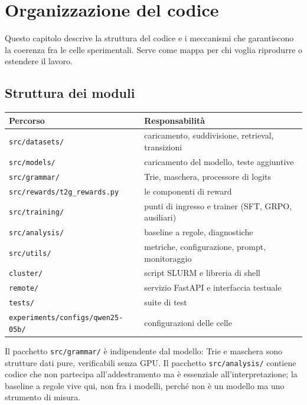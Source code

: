 \chapter{Organizzazione del codice}
\label{cap:codebase}

Questo capitolo descrive la struttura del codice e i meccanismi che garantiscono
la coerenza fra le celle sperimentali. Serve come mappa per chi voglia
riprodurre o estendere il lavoro.

\section{Struttura dei moduli}

\begin{center}
\begin{tabular}{ll}
\toprule
Percorso & Responsabilità \\
\midrule
\texttt{src/datasets/} & caricamento, suddivisione, retrieval, transizioni \\
\texttt{src/models/} & caricamento del modello, teste aggiuntive \\
\texttt{src/grammar/} & Trie, maschera, processore di logits \\
\texttt{src/rewards/t2g\_rewards.py} & le componenti di reward \\
\texttt{src/training/} & punti di ingresso e trainer (SFT, GRPO, ausiliari) \\
\texttt{src/analysis/} & baseline a regole, diagnostiche \\
\texttt{src/utils/} & metriche, configurazione, prompt, monitoraggio \\
\texttt{cluster/} & script SLURM e libreria di shell \\
\texttt{remote/} & servizio FastAPI e interfaccia testuale \\
\texttt{tests/} & suite di test \\
\texttt{experiments/configs/qwen25-05b/} & configurazioni delle celle \\
\bottomrule
\end{tabular}
\end{center}

Il pacchetto \texttt{src/grammar/} è indipendente dal modello: Trie e maschera
sono strutture dati pure, verificabili senza GPU. Il pacchetto
\texttt{src/analysis/} contiene codice che non partecipa all'addestramento ma è
essenziale all'interpretazione; la baseline a regole vive qui, non fra i modelli,
perché non è un modello ma uno strumento di misura.

